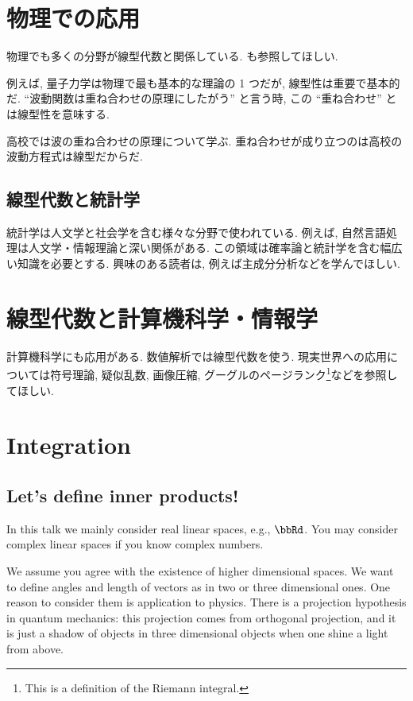 \documentclass[openany, a4paper, oneside]{jsbook}
\begin{document}
\section{物理での応用}

物理でも多くの分野が線型代数と関係している.
\cite{phasetr2} も参照してほしい.

例えば, 量子力学は物理で最も基本的な理論の 1 つだが,
線型性は重要で基本的だ.
``波動関数は重ね合わせの原理にしたがう'' と言う時,
この ``重ね合わせ'' とは線型性を意味する.

高校では波の重ね合わせの原理について学ぶ.
重ね合わせが成り立つのは高校の波動方程式は線型だからだ.
\subsection{線型代数と統計学}

統計学は人文学と社会学を含む様々な分野で使われている.
例えば, 自然言語処理は人文学・情報理論と深い関係がある.
この領域は確率論と統計学を含む幅広い知識を必要とする.
興味のある読者は, 例えば主成分分析などを学んでほしい.
\section{線型代数と計算機科学・情報学}

計算機科学にも応用がある.
数値解析では線型代数を使う.
現実世界への応用については符号理論, 疑似乱数,
画像圧縮, グーグルのページランク\footnote{This is a definition of the Riemann integral.}などを参照してほしい.


\section{Integration}

\subsection{Let's define inner products!}

In this talk we mainly consider real linear spaces, e.g., $\bbRd$.
You may consider complex linear spaces if you know complex numbers.

We assume you agree with the existence of higher dimensional spaces.
We want to define angles and length of vectors as in two or three dimensional ones.
One reason to consider them is application to physics.
There is a projection hypothesis in quantum mechanics:
this projection comes from orthogonal projection,
and it is just a shadow of objects in three dimensional objects when
one shine a light from above.
\end{document}
